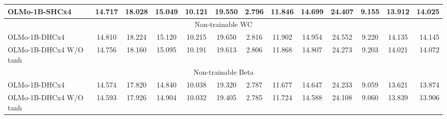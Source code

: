 \begin{table}[h]
{\begin{minipage}{\textheight}
\begin{tabular}{lcccccccccccr}
OLMo-1B-SHCx4 & 14.717 & 18.028 & 15.049 & 10.121 & 19.550 & 2.796 & 11.846 & 14.699 & 24.407 & 9.155 & 13.912 & 14.025 \\
\midrule
\multicolumn{13}{c}{\cellcolor{gray!20} Non-trainable WC} \\
\midrule
OLMo-1B-DHCx4 & 14.810 & 18.224 & 15.120 & 10.215 & 19.650 & 2.816 & 11.902 & 14.954 & 24.552 & 9.220 & 14.135 & 14.145 \\
OLMo-1B-DHCx4 W/O tanh & 14.756 & 18.160 & 15.095 & 10.191 & 19.613 & 2.806 & 11.868 & 14.807 & 24.273 & 9.203 & 14.021 & 14.072 \\
\midrule
\multicolumn{13}{c}{\cellcolor{gray!20} Non-trainable Beta} \\
\midrule
OLMo-1B-DHCx4 & 14.574 & 17.820 & 14.840 & 10.038 & 19.320 & 2.787 & 11.677 & 14.647 & 24.233 & 9.059 & 13.621 & 13.874 \\
OLMo-1B-DHCx4 W/O tanh & 14.593 & 17.926 & 14.904 & 10.032 & 19.405 & 2.785 & 11.724 & 14.588 & 24.108 & 9.060 & 13.839 & 13.906 \\
\bottomrule
\end{tabular}
\label{tab:v3_validation_set_perplexity}
\end{minipage}
}
\end{table}